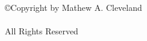 
\thispagestyle{empty}

\belowSecSkip

\vspace*{2.5in}

\begin{center}
	\copyright Copyright by Mathew A. Cleveland \\
	\myDefenseDate \\
	All Rights Reserved
\end{center}

